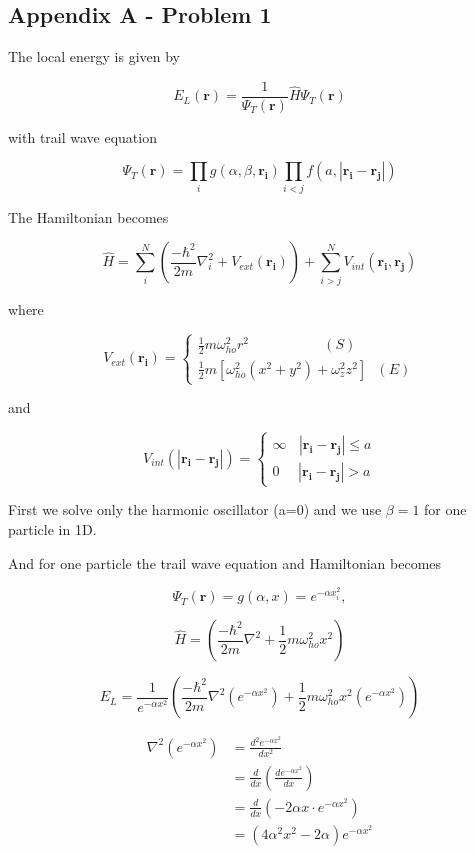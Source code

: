 \subsection*{Appendix A - Problem 1}

The local energy is given by

$$E_L(\mathbf{r})=\frac{1}{\Psi_T(\mathbf{r})}\hat{H}\Psi_T(\mathbf{r})$$

with trail wave equation

$$\Psi_T(\mathbf{r}) = \prod_{i} g(\alpha, \beta, \mathbf{r_i}) \prod_{i<j} f(a, |\mathbf{r_i} - \mathbf{r_j}|)$$

The Hamiltonian becomes

$$\hat{H} = \sum_{i}^{N} \left( \frac{-\hbar^2}{2m} \nabla_i^2 + V_{ext}(\mathbf{r_i})\right) + \sum_{i>j}^{N} V_{int}(\mathbf{r_i}, \mathbf{r_j})$$

where  

$$
V_{ext}(\mathbf{r_i}) = 
\begin{cases}
\frac{1}{2} m\omega_{ho}^2 r^2\ \ \ \ \ \ \ \ \ \ \ \ \ \ \ \ \ \ \ \ \ \ \ \ (S)\\
\frac{1}{2} m [\omega_{ho}^2(x^2+ y^2) + \omega_z^2 z^2]\ \ \  (E)
\end{cases}
$$

and

$$
V_{int}(|\mathbf{r_i} - \mathbf{r_j}|) = 
\begin{cases}
\infty \ \ \ \   |\mathbf{r_i} - \mathbf{r_j}| \le a \\
0 \ \ \ \ \ \ |\mathbf{r_i} - \mathbf{r_j}| > a
\end{cases}
$$


First we solve only the harmonic oscillator (a=0) and we use $\beta = 1$ for one particle in 1D.

And for one particle the trail wave equation and Hamiltonian becomes

$$\Psi_T(\mathbf{r}) = g(\alpha, x) = e^{-\alpha x_i^2},$$

$$\hat{H} = \left( \frac{-\hbar^2}{2m} \nabla^2 + \frac{1}{2} m\omega_{ho}^2 x^2\right)$$

$$E_L = \frac{1}{e^{-\alpha x^2}}\left( \frac{-\hbar^2}{2m} \nabla^2 (e^{-\alpha x^2}) + \frac{1}{2} m\omega_{ho}^2 x^2(e^{-\alpha x^2})\right)$$

\begin{align*}
\nabla^2(e^{-\alpha x^2}) &= \frac{d^2 e^{-\alpha x^2}}{dx^2}\\
&= \frac{d}{dx} \left(\frac{de^{-\alpha x^2}}{dx}\right)\\
&= \frac{d}{dx} (-2\alpha x \cdot e^{-\alpha x^2})\\
&= (4\alpha^2 x^2 - 2\alpha)e^{-\alpha x^2} 
\end{align*}

